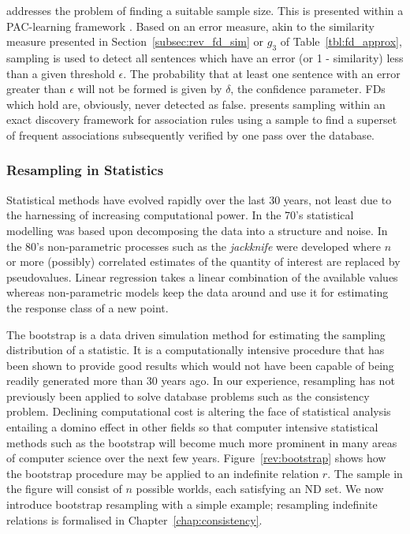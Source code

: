 \medskip

\cite{km94} addresses the problem of finding a suitable sample
size. This is presented within a PAC-learning framework
\cite{val84}. Based on an error measure, akin to the similarity
measure presented in Section~\ref{subsec:rev_fd_sim} or $g_3$ of
Table~\ref{tbl:fd_approx},  sampling is used to detect all sentences
which have an 
error (or 1 - similarity) less than a given threshold
$\epsilon$. The probability that at least one sentence with an error
greater than $\epsilon$ will not be formed is given by $\delta$, the
confidence parameter. FDs which hold are, obviously, never detected as
false. \cite{toi96b} presents sampling within an exact discovery
framework for association rules using a sample to find a superset of
frequent associations subsequently verified by one pass over the
database.


\subsubsection{Resampling in Statistics}
Statistical methods have evolved rapidly over
the last 30 years, not least due to the harnessing of increasing
computational power.  In the 70's statistical modelling was based upon
decomposing the data into a structure and noise.  In the 80's
non-parametric 
processes such as the {\em jackknife} were developed where $n$ or more
(possibly) correlated estimates of the quantity of interest are
replaced by pseudovalues. Linear regression takes a linear combination
of the available values whereas non-parametric models keep the data
around and use it for estimating the response class of a new point.


The bootstrap \cite{efro79,de83,et93} is a data driven
simulation method for estimating the sampling distribution of a
statistic. It is a computationally 
intensive procedure that has been shown to provide good results which
would not have been capable of being readily generated more than 30 years ago.
In our experience, resampling has not previously been 
applied to solve database problems such as the consistency problem.
Declining computational cost is altering the face of statistical analysis
entailing a domino effect in other fields so that computer
intensive statistical methods such as the bootstrap will become much
more prominent in many areas of computer science over the next few years.
Figure~\ref{rev:bootstrap} shows how the
bootstrap procedure may be applied to an indefinite relation $r$. The
sample in the figure will consist of $n$ possible worlds, each
satisfying an ND set. We now introduce bootstrap resampling with a
simple example; resampling indefinite relations is formalised in
Chapter~\ref{chap:consistency}. 

